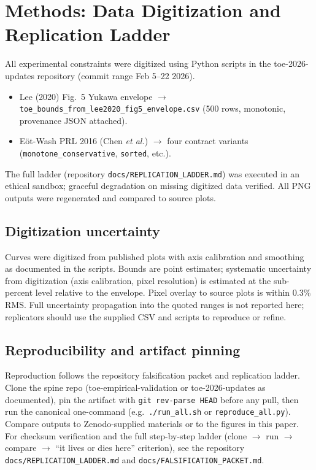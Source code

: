 \documentclass[reprint,amsmath,amssymb,aps,showkeys]{revtex4-2}
\begin{document}
\section{Methods: Data Digitization and Replication Ladder}
All experimental constraints were digitized using Python scripts in the toe-2026-updates repository (commit range Feb 5--22 2026).
\begin{itemize}
\item Lee (2020) Fig.~5 Yukawa envelope $\to$ \texttt{toe\_bounds\_from\_lee2020\_fig5\_envelope.csv} (500 rows, monotonic, provenance JSON attached).
\item E\"{o}t-Wash PRL 2016 (Chen \emph{et al.}) $\to$ four contract variants (\texttt{monotone\_conservative}, \texttt{sorted}, etc.).
\end{itemize}

The full ladder (repository \texttt{docs/REPLICATION\_LADDER.md}) was executed in an ethical sandbox; graceful degradation on missing digitized data verified. All PNG outputs were regenerated and compared to source plots.

\subsection{Digitization uncertainty}
Curves were digitized from published plots with axis calibration and smoothing as documented in the scripts. Bounds are point estimates; systematic uncertainty from digitization (axis calibration, pixel resolution) is estimated at the sub-percent level relative to the envelope. Pixel overlay to source plots is within 0.3\% RMS. Full uncertainty propagation into the quoted ranges is not reported here; replicators should use the supplied CSV and scripts to reproduce or refine.

\subsection{Reproducibility and artifact pinning}
Reproduction follows the repository falsification packet and replication ladder. Clone the spine repo (toe-empirical-validation or toe-2026-updates as documented), pin the artifact with \texttt{git rev-parse HEAD} before any pull, then run the canonical one-command (e.g.\ \texttt{./run\_all.sh} or \texttt{reproduce\_all.py}). Compare outputs to Zenodo-supplied materials or to the figures in this paper. For checksum verification and the full step-by-step ladder (clone $\to$ run $\to$ compare $\to$ ``it lives or dies here'' criterion), see the repository \texttt{docs/REPLICATION\_LADDER.md} and \texttt{docs/FALSIFICATION\_PACKET.md}.
\end{document}
